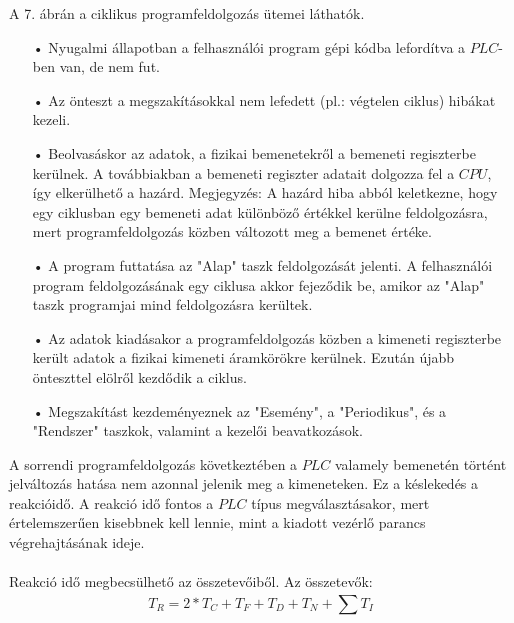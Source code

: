 \documentclass[11pt,a4paper]{article}
\begin{document}
A 7. ábrán a ciklikus programfeldolgozás ütemei láthatók.
\begin{enumerate}
	\item[•]Nyugalmi állapotban a felhasználói program gépi  kódba lefordítva a $PLC$-ben van, de nem fut.
	\item[•]Az önteszt a megszakításokkal nem lefedett (pl.: végtelen ciklus) hibákat kezeli.
	\item[•]Beolvasáskor az adatok, a fizikai bemenetekről a bemeneti regiszterbe kerülnek. 
 A továbbiakban a bemeneti regiszter adatait dolgozza fel a $CPU$, így elkerülhető a hazárd.
 Megjegyzés: A hazárd hiba abból keletkezne, hogy egy ciklusban egy bemeneti adat különböző értékkel kerülne feldolgozásra, mert programfeldolgozás közben változott meg a bemenet értéke.
	\item[•]A program futtatása az "Alap" taszk feldolgozását jelenti. A felhasználói program feldolgozásának egy ciklusa akkor fejeződik be, amikor az "Alap" taszk programjai mind feldolgozásra kerültek. 
	\item[•]Az adatok kiadásakor a programfeldolgozás közben a kimeneti regiszterbe került adatok a fizikai kimeneti áramkörökre kerülnek. Ezután újabb önteszttel elölről kezdődik a ciklus.
	\item[•]Megszakítást kezdeményeznek az "Esemény", a "Periodikus", és a "Rendszer" taszkok, valamint a kezelői beavatkozások.
\end{enumerate}
A sorrendi programfeldolgozás következtében a $PLC$ valamely bemenetén történt jelváltozás hatása nem azonnal jelenik meg a kimeneteken. Ez a késlekedés a reakcióidő. A reakció idő fontos a $PLC$ típus megválasztásakor, mert értelemszerűen kisebbnek kell lennie, mint a kiadott vezérlő parancs végrehajtásának ideje.\\\\
Reakció idő megbecsülhető az összetevőiből. Az összetevők:$$T_R = 2 * T_C + T_F + T_D + T_N + \sum_{}^{}T_I$$
\end{document}
